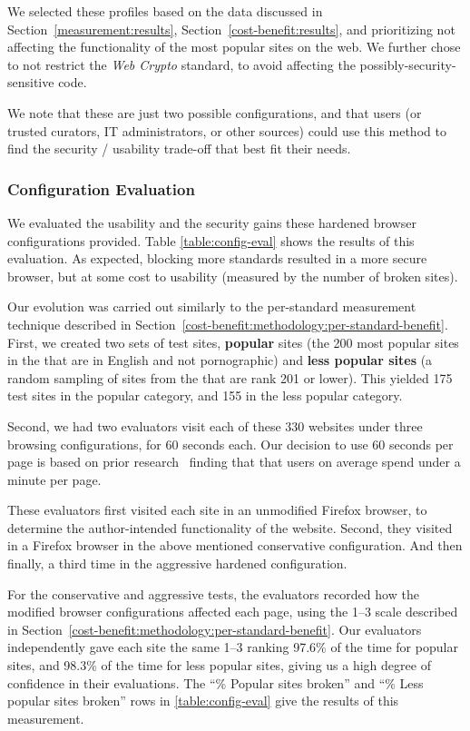 We selected these profiles based on the data discussed in
Section~\ref{measurement:results}, Section~\ref{cost-benefit:results}, and
prioritizing not affecting the functionality of the most popular sites on the
web.  We further chose to not restrict the \emph{Web Crypto} standard, to avoid
affecting the possibly-security-sensitive code.

We note that these are just two possible configurations, and that users
(or trusted curators, IT administrators, or other sources) could
use this method to find the security / usability trade-off that best fit their needs.


\subsubsection{Configuration Evaluation}
\label{current-web:extension:configuration-evaluations}


We evaluated the usability and the security gains these hardened browser
configurations provided.  Table \ref{table:config-eval}
shows the results of this evaluation.  As expected, blocking more standards
resulted in a more secure browser, but at some cost to usability (measured
by the number of broken sites).

Our evolution was carried out similarly to the per-standard measurement
technique described in
Section~\ref{cost-benefit:methodology:per-standard-benefit}.  First, we created
two sets of test sites, \textbf{popular} sites (the 200 most popular sites in
the \ATK that are in English and not pornographic) and \textbf{less
popular sites} (a random sampling of sites from the \ATK that are rank 201
or lower).  This yielded 175 test sites in the popular category, and 155 in the
less popular category.

Second, we had two evaluators visit each of these 330 websites under three browsing
configurations, for 60 seconds each.  Our decision to use 60 seconds per page
is based on prior research~\cite{liu2010understanding} finding that
that users on average spend under a minute per page.

These evaluators first visited each site in an unmodified
Firefox browser, to determine the author-intended functionality of the website.
Second, they visited in a Firefox browser in the above mentioned conservative
configuration.  And then finally, a third time in the aggressive hardened
configuration.

For the conservative and aggressive tests, the evaluators recorded how the
modified browser configurations affected each page, using the 1--3 scale
described in Section~\ref{cost-benefit:methodology:per-standard-benefit}.  Our
evaluators independently gave each site the same 1--3 ranking 97.6\% of the
time for popular sites, and 98.3\% of the time for less popular sites, giving
us a high degree of confidence in their evaluations.  The ``\% Popular sites
broken'' and ``\% Less popular sites broken'' rows in \ref{table:config-eval}
give the results of this measurement.

